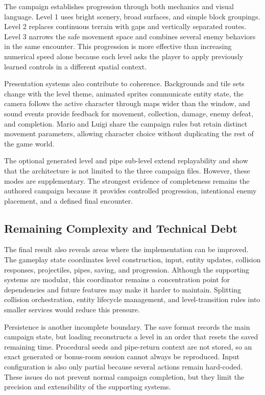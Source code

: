 \documentclass{template}
\begin{document}
The campaign establishes progression through both mechanics and visual
language. Level 1 uses bright scenery, broad surfaces, and simple block
groupings. Level 2 replaces continuous terrain with gaps and vertically
separated routes. Level 3 narrows the safe movement space and combines several
enemy behaviors in the same encounter. This progression is more effective than
increasing numerical speed alone because each level asks the player to apply
previously learned controls in a different spatial context.

Presentation systems also contribute to coherence. Backgrounds and tile sets
change with the level theme, animated sprites communicate entity state, the
camera follows the active character through maps wider than the window, and
sound events provide feedback for movement, collection, damage, enemy defeat,
and completion. Mario and Luigi share the campaign rules but retain distinct
movement parameters, allowing character choice without duplicating the rest of
the game world.

The optional generated level and pipe sub-level extend replayability and show
that the architecture is not limited to the three campaign files. However,
these modes are supplementary. The strongest evidence of completeness remains
the authored campaign because it provides controlled progression, intentional
enemy placement, and a defined final encounter.

\subsection{Remaining Complexity and Technical Debt}

The final result also reveals areas where the implementation can be improved.
The gameplay state coordinates level construction, input, entity updates,
collision responses, projectiles, pipes, saving, and progression. Although the
supporting systems are modular, this coordinator remains a concentration point
for dependencies and future features may make it harder to maintain. Splitting
collision orchestration, entity lifecycle management, and level-transition
rules into smaller services would reduce this pressure.

Persistence is another incomplete boundary. The save format records the main
campaign state, but loading reconstructs a level in an order that resets the
saved remaining time. Procedural seeds and pipe-return context are not stored,
so an exact generated or bonus-room session cannot always be reproduced. Input
configuration is also only partial because several actions remain hard-coded.
These issues do not prevent normal campaign completion, but they limit the
precision and extensibility of the supporting systems.
\end{document}
